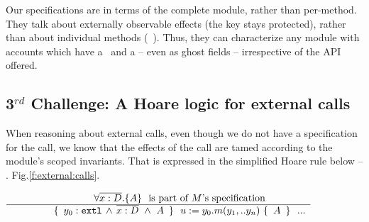  \noindent
 Our specifications are  in terms of the complete module, rather than per-method.
 They talk about externally observable effects (\eg the key stays protected), 
 rather than about  individual methods (\eg\, ). %
{Thus,  %
  they can characterize  any 
module with  accounts which have a %
 \balance~and a \password -- even as ghost fields --}  irrespective of the API offered.

  
  \subsection{3$^{rd}$ Challenge:  A Hoare logic for external calls} %
 \label{sec:howThird}
 
 When reasoning about external calls, even though we do not have a specification for the call, we know that the effects of the call are tamed according to the module's scoped invariants. That is expressed in the  simplified Hoare rule below -- \cf. Fig.\ref{f:external:calls}. 
 
  $\begin{array}{c} \strut \hspace{1.5cm} { 
   	   {\ensuremath{\forall {\overline {x:D}}.{{\{}}{A}{{\}}}}}\ \   \mbox{is part of $M$'s specification}
        } \\ \hline \strut \hspace{1.5cm}     \{\,  \    { y_0:\mbox{\normalfont{\texttt{extl}}}} \,     \wedge \,  \overline{x:D}\  \wedge\  A\  \, \}\  \ u:=y_0.m(y_1,.. y_n)\     \{\,  \    A  \  \, \}
						\  \  ...
          \end{array}
$

\vspace{.1cm}

